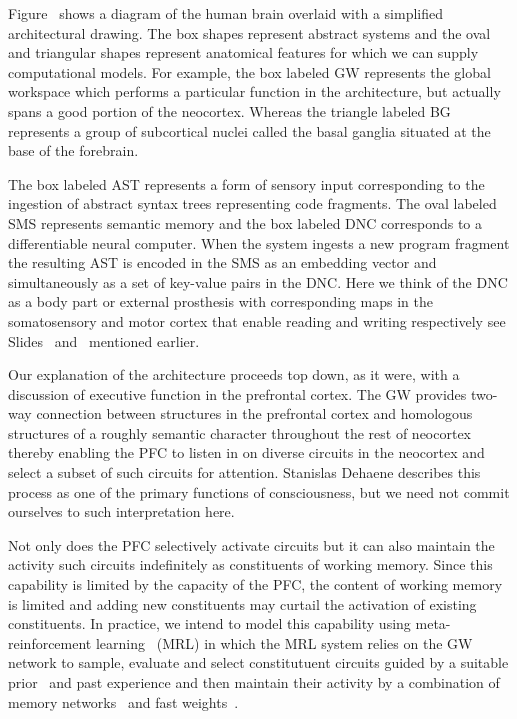 
Figure~{} shows a diagram of the human brain overlaid with a simplified architectural drawing. The box shapes represent abstract systems and the oval and triangular shapes represent anatomical features for which we can supply computational models. For example, the box labeled GW represents the global workspace which performs a particular function in the architecture, but actually spans a good portion of the neocortex. Whereas the triangle labeled BG represents a group of subcortical nuclei called the basal ganglia situated at the base of the forebrain.

The box labeled AST represents a form of sensory input corresponding to the ingestion of abstract syntax trees representing code fragments. The oval labeled SMS represents semantic memory and the box labeled DNC corresponds to a differentiable neural computer. When the system ingests a new program fragment the resulting AST is encoded in the SMS as an embedding vector and simultaneously as a set of key-value pairs in the DNC. Here we think of the DNC as a body part or external prosthesis with corresponding maps in the somatosensory and motor cortex that enable reading and writing respectively \emdash{} see Slides~{{}} and~{{}} mentioned earlier.

Our explanation of the architecture proceeds top down, as it were, with a discussion of executive function in the prefrontal cortex. The GW provides two-way connection between structures in the prefrontal cortex and homologous structures of a roughly semantic character throughout the rest of neocortex thereby enabling the PFC to listen in on diverse circuits in the neocortex and select a subset of such circuits for attention. Stanislas Dehaene describes this process as one of the primary functions of consciousness, but we need not commit ourselves to such interpretation here.

Not only does the PFC selectively activate circuits but it can also maintain the activity such circuits indefinitely as constituents of working memory. Since this capability is limited by the capacity of the PFC, the content of working memory is limited and adding new constituents may curtail the activation of existing constituents. In practice, we intend to model this capability using meta-reinforcement learning~\cite{WangetalNATURE-NEUROSCIENCE-18} (MRL) in which the MRL system relies on the GW network to sample, evaluate and select constitutuent circuits guided by a suitable prior~\cite{BengioCoRR-17} and past experience and then maintain their activity by a combination of memory networks~\cite{WestonetalCoRR-14} and fast weights~\cite{BaetalCoRR-16}. 

